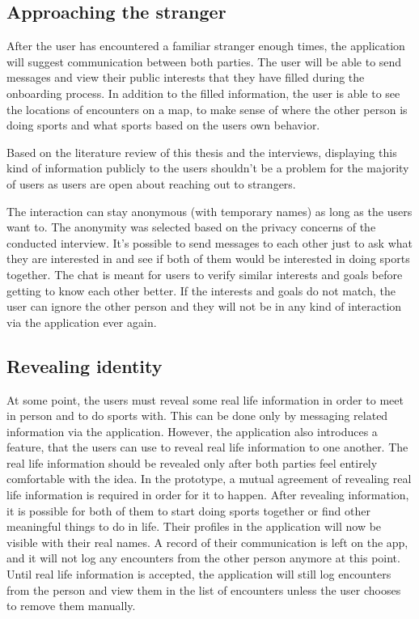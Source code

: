 \subsection{Approaching the stranger}

After the user has encountered a familiar stranger enough times, the application will suggest communication between both parties. The user will be able to send messages and view their public interests that they have filled during the onboarding process. In addition to the filled information, the user is able to see the locations of encounters on a map, to make sense of where the other person is doing sports and what sports based on the users own behavior. 

Based on the literature review of this thesis and the interviews, displaying this kind of information publicly to the users shouldn't be a problem for the majority of users as users are open about reaching out to strangers.

The interaction can stay anonymous (with temporary names) as long as the users want to. The anonymity was selected based on the privacy concerns of the conducted interview. It's possible to send messages to each other just to ask what they are interested in and see if both of them would be interested in doing sports together. The chat is meant for users to verify similar interests and goals before getting to know each other better. If the interests and goals do not match, the user can ignore the other person and they will not be in any kind of interaction via the application ever again.

\subsection{Revealing identity}

At some point, the users must reveal some real life information in order to meet in person and to do sports with. This can be done only by messaging related information via the application. However, the application also introduces a feature, that the users can use to reveal real life information to one another. The real life information should be revealed only after both parties feel entirely comfortable with the idea. In the prototype, a mutual agreement of revealing real life information is required in order for it to happen. After revealing information, it is possible for both of them to start doing sports together or find other meaningful things to do in life. Their profiles in the application will now be visible with their real names. A record of their communication is left on the app, and it will not log any encounters from the other person anymore at this point. Until real life information is accepted, the application will still log encounters from the person and view them in the list of encounters unless the user chooses to remove them manually.

